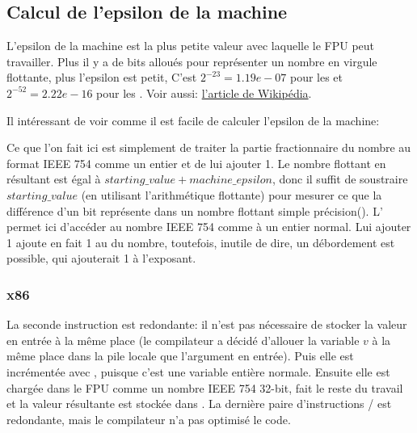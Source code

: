 ﻿\subsection{Calcul de l'epsilon de la machine}

L'epsilon de la machine est la plus petite valeur avec laquelle le \ac{FPU} peut
travailler.
Plus il y a de bits alloués pour représenter un nombre en virgule flottante, plus
l'epsilon est petit,
C'est $2^{-23} = 1.19e-07$ pour les \Tfloat et $2^{-52} = 2.22e-16$ pour les \Tdouble.
Voir aussi: \href{http://link.yurichev.com/17367}{l'article de Wikipédia}.%

Il intéressant de voir comme il est facile de calculer l'epsilon de la machine:



Ce que l'on fait ici est simplement de traiter la partie fractionnaire du nombre
au format IEEE 754 comme un entier et de lui ajouter 1.
Le nombre flottant en résultant est égal à $starting\_value+machine\_epsilon$, donc
il suffit de soustraire $starting\_value$ (en utilisant l'arithmétique flottante)
pour mesurer ce que la différence d'un bit représente dans un nombre flottant simple
précision(\Tfloat).
L'  permet ici d'accéder au nombre IEEE 754 comme à un entier normal.
Lui ajouter 1 ajoute en fait 1 au  du nombre, toutefois, inutile
de dire, un débordement est possible, qui ajouterait 1 à l'exposant.

\subsubsection{x86}



La seconde instruction  est redondante: il n'est pas nécessaire de stocker
la valeur en entrée à la même place (le compilateur a décidé d'allouer la variable
$v$ à la même place dans la pile locale que l'argument en entrée).
Puis elle est incrémentée avec , puisque c'est une variable entière normale.
Ensuite elle est chargée dans le FPU comme un nombre IEEE 754 32-bit, 
fait le reste du travail et la valeur résultante est stockée dans .
La dernière paire d'instructions / est redondante, mais le compilateur
n'a pas optimisé le code.

